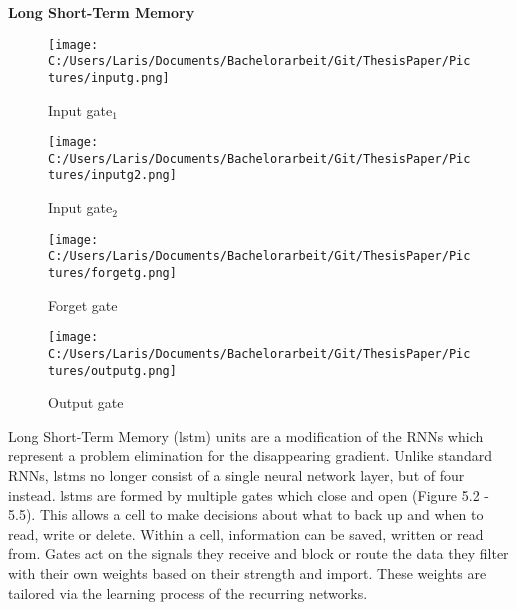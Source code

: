 \documentclass[a4paper, 11pt,titlepage,oneside,openany]{book}
\begin{document}
\noindent \textbf{Long Short-Term Memory} \\
\begin{figure}[h]
	\begin{minipage}[b]{0.4\linewidth}
		\texttt{[image: C:/Users/Laris/Documents/Bachelorarbeit/Git/ThesisPaper/Pictures/inputg.png]}
		\caption{Input gate$_1$ \cite{rnn}}
	\end{minipage}
	\hfill
	\begin{minipage}[b]{0.4\linewidth}
		\texttt{[image: C:/Users/Laris/Documents/Bachelorarbeit/Git/ThesisPaper/Pictures/inputg2.png]}
		\caption{Input gate$_2$ \cite{rnn}}
	\end{minipage}
	\begin{minipage}[b]{0.4\linewidth}
		\texttt{[image: C:/Users/Laris/Documents/Bachelorarbeit/Git/ThesisPaper/Pictures/forgetg.png]}
		\caption{Forget gate \cite{rnn}}
	\end{minipage}
	\hfill
	\begin{minipage}[b]{0.4\linewidth}
		\texttt{[image: C:/Users/Laris/Documents/Bachelorarbeit/Git/ThesisPaper/Pictures/outputg.png]}
		\caption{Output gate \cite{rnn}}
	\end{minipage}
\end{figure}
Long Short-Term Memory (\gls{lstm}) units \cite{lstm} are a modification of the RNNs which represent a problem elimination for the disappearing gradient. Unlike standard RNNs, \gls{lstm}s no longer consist of a single neural network layer, but of four instead. \gls{lstm}s are formed by multiple gates which close and open (Figure 5.2 - 5.5). This allows a cell to make decisions about what to back up and when to read, write or delete. Within a cell, information can be saved, written or read from. Gates act on the signals they receive and block or route the data they filter with their own weights based on their strength and import. These weights are tailored via the learning process of the recurring networks. 
\end{document}
